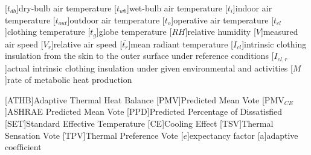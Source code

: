 \documentclass[a4paper, 10pt]{letter}
\begin{document}
    \renewcommand{\baselinestretch}{0.75}\normalsize
    \renewcommand{\aclabelfont}[1]{\textsc{\acsfont{#1}}}

    [$t_{db}$]{dry-bulb air temperature}
    [$t_{wb}$]{wet-bulb air temperature}
    [$t_{i}$]{indoor air temperature}
    [$t_{out}$]{outdoor air temperature}
    [$t_{o}$]{operative air temperature}
    [$t_{cl}$]{clothing temperature}
    [$t_{g}$]{globe temperature}
    [$RH$]{relative humidity\acroextra{, \%}}
    [$V$]{measured air speed}
    [$V_{r}$]{relative air speed}
    [$\overline{t_{r}}$]{mean radiant temperature}
    [$I_{cl}$]{intrinsic clothing insulation from the skin to the outer surface under reference conditions}
    [$I_{cl,r}$]{actual intrinsic clothing insulation under given environmental and activities}
    [$M$]{rate of metabolic heat production}

    [ATHB]{Adaptive Thermal Heat Balance}
    [PMV]{Predicted Mean Vote}
    [PMV$_{CE}$]{ASHRAE Predicted Mean Vote}
    [PPD]{Predicted Percentage of Dissatisfied\acroextra{, \%}}
    [SET]{Standard Effective Temperature}
    [CE]{Cooling Effect}
    [TSV]{Thermal Sensation Vote}
    [TPV]{Thermal Preference Vote}
    [$e$]{expectancy factor}
    [a]{adaptive coefficient}
\end{document}
